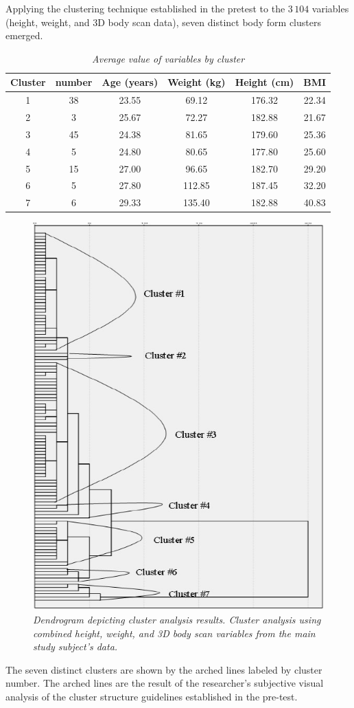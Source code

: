 \documentclass[12pt,a4paper,openany,UKenglish]{scrreprt}
\begin{document}
Applying the clustering technique established in the pretest to the $3\,104$ variables (height, weight, and 3D body scan data), seven distinct body form clusters emerged.
\begin{table}[H]
	\begin{center}
		\caption{\centering\itshape Average value of variables by cluster}
		{\small
			\begin{tabular}{cccccc}
				\hline
				Cluster & number & Age (years) & Weight (kg) & Height (cm) & BMI   \\
				\hline
				1       & 38     & 23.55       & 69.12       & 176.32      & 22.34 \\
				2       & 3      & 25.67       & 72.27       & 182.88      & 21.67 \\
				3       & 45     & 24.38       & 81.65       & 179.60      & 25.36 \\
				4       & 5      & 24.80       & 80.65       & 177.80      & 25.60 \\
				5       & 15     & 27.00       & 96.65       & 182.70      & 29.20 \\
				6       & 5      & 27.80       & 112.85      & 187.45      & 32.20 \\
				7       & 6      & 29.33       & 135.40      & 182.88      & 40.83 \\
				\hline
			\end{tabular}}
	\end{center}
\end{table}

\begin{figure}[H]
	\centering
	\caption{\small\centering\itshape Dendrogram depicting cluster analysis results. Cluster analysis using combined height, weight, and 3D body scan variables from the main study subject’s data.}
	\includegraphics[width=0.65\linewidth]{../Images/Cottle.jpg}
\end{figure}
The seven distinct clusters are shown by the arched lines labeled by cluster number.
The arched lines are the result of the researcher’s subjective visual analysis of the cluster structure guidelines established in the pre-test.
\end{document}
